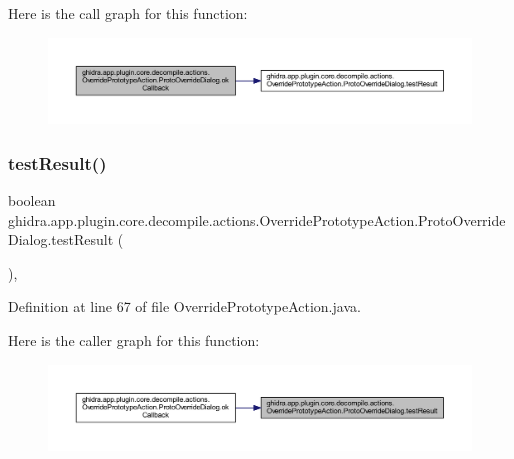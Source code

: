 Here is the call graph for this function\+:
\nopagebreak
\begin{figure}[H]
\begin{center}
\leavevmode
\includegraphics[width=350pt]{classghidra_1_1app_1_1plugin_1_1core_1_1decompile_1_1actions_1_1_override_prototype_action_1_1_proto_override_dialog_aaf58728fc063b0a5129eb42f007ff6c1_cgraph}
\end{center}
\end{figure}
\mbox{\label{classghidra_1_1app_1_1plugin_1_1core_1_1decompile_1_1actions_1_1_override_prototype_action_1_1_proto_override_dialog_a068e14fd3b4928c457ad0687c64ebf5f}} 
\subsubsection{\texorpdfstring{testResult()}{testResult()}}
{\footnotesize\ttfamily boolean ghidra.\+app.\+plugin.\+core.\+decompile.\+actions.\+Override\+Prototype\+Action.\+Proto\+Override\+Dialog.\+test\+Result (\begin{DoxyParamCaption}{ }\end{DoxyParamCaption})\hspace{0.3cm}{\ttfamily [inline]}, {\ttfamily [protected]}}



Definition at line 67 of file Override\+Prototype\+Action.\+java.

Here is the caller graph for this function\+:
\nopagebreak
\begin{figure}[H]
\begin{center}
\leavevmode
\includegraphics[width=350pt]{classghidra_1_1app_1_1plugin_1_1core_1_1decompile_1_1actions_1_1_override_prototype_action_1_1_proto_override_dialog_a068e14fd3b4928c457ad0687c64ebf5f_icgraph}
\end{center}
\end{figure}


